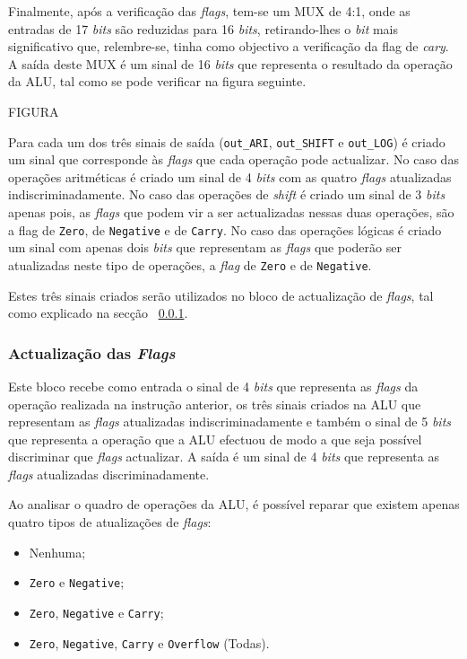 \documentclass[11pt]{article}
\numberwithin{equation}{section}
\begin{document}
Finalmente, após a verificação das \textit{flags}, tem-se um MUX de 4:1, onde as entradas de 17 \textit{bits} são reduzidas para 16 \textit{bits}, retirando-lhes o \textit{bit} mais significativo que, relembre-se, tinha como objectivo a verificação da flag de \textit{cary}. A saída deste MUX é um sinal de 16 \textit{bits} que representa o resultado da operação da ALU, tal como se pode verificar na figura seguinte.

FIGURA

Para cada um dos três sinais de saída (\texttt{out\_ARI}, \texttt{out\_SHIFT} e \texttt{out\_LOG}) é criado um sinal que corresponde às \textit{flags} que cada operação pode actualizar. No caso das operações aritméticas é criado um sinal de 4 \textit{bits} com as quatro \textit{flags} atualizadas indiscriminadamente. No caso das operações de \textit{shift} é criado um sinal de 3 \textit{bits} apenas pois, as \textit{flags} que podem vir a ser actualizadas nessas duas operações, são a flag de \texttt{Zero}, de \texttt{Negative} e de \texttt{Carry}. No caso das operações lógicas é criado um sinal com apenas dois \textit{bits} que representam as \textit{flags} que poderão ser atualizadas neste tipo de operações, a \textit{flag} de \texttt{Zero} e de \texttt{Negative}.

Estes três sinais criados serão utilizados no bloco de actualização de \textit{flags}, tal como explicado na secção ~\ref{subsec:act-flags}.

\subsubsection{Actualização das \textit{Flags}}
\label{subsec:act-flags}

Este bloco recebe como entrada o sinal de 4 \textit{bits} que representa as \textit{flags} da operação realizada na instrução anterior, os três sinais criados na ALU que representam as \textit{flags} atualizadas indiscriminadamente e também o sinal de 5 \textit{bits} que representa a operação que a ALU efectuou de modo a que seja possível discriminar que \textit{flags} actualizar. A saída é um sinal de 4 \textit{bits} que representa as \textit{flags} atualizadas discriminadamente.

Ao analisar o quadro de operações da ALU, é possível reparar que existem apenas quatro tipos de atualizações de \textit{flags}:

\vspace{-2mm}

\begin{itemize}
  \item Nenhuma;
  \vspace{-2.5mm}
  \item \texttt{Zero} e \texttt{Negative};
  \vspace{-2.5mm}
  \item \texttt{Zero}, \texttt{Negative} e \texttt{Carry};
  \vspace{-2.5mm}
  \item \texttt{Zero}, \texttt{Negative}, \texttt{Carry} e \texttt{Overflow} (Todas).
\end{itemize}
\end{document}
